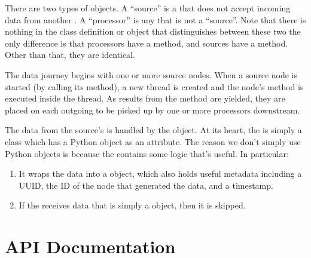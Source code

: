 \documentclass[letterpaper,10pt,english]{sphinxmanual}
\begin{document}
There are two types of  objects. A “source” is a  that does not accept incoming data from another . A “processor” is any  that is not a “source”. Note that there is nothing in the class definition or object that distinguishes between these two \textendash{} the only
difference is that processors have a  method, and sources have a  method. Other than that, they are identical.

The data journey begins with one or more source nodes. When a source node is started (by calling its  method), a new thread is created and the node’s  method is executed inside the thread. As results from the  method are yielded, they are placed on each outgoing  to be picked up by one or more processors downstream.

The data from the source’s  is handled by the  object. At its heart, the  is simply a class which has a Python  object as an attribute. The reason we don’t simply use Python  objects is because the  contains some logic that’s useful. In particular:
\begin{enumerate}
\def\theenumi{\arabic{enumi}}
\def\labelenumi{\theenumi .}
\makeatletter\def\p@enumii{\p@enumi \theenumi .}\makeatother
\item {} 
It wraps the data into a  object, which also holds useful metadata including a UUID, the ID of the node that generated the data, and a timestamp.

\item {} 
If the  receives data that is simply a  object, then it is skipped.

\end{enumerate}


\chapter{API Documentation}
\label{\detokenize{api:module-nanostream.node}}\label{\detokenize{api:api-documentation}}\label{\detokenize{api::doc}}
\end{document}
